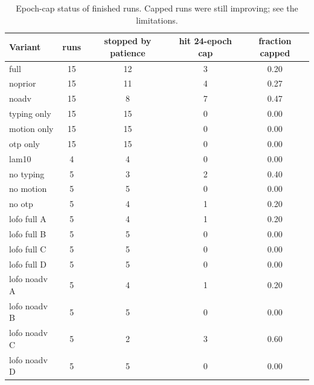 \begin{table}[t]
\caption{Epoch-cap status of finished runs. Capped runs were still improving; see the limitations.}
\label{tab:cap}
\centering
\small
\begin{tabular}{lcccc}
\toprule
Variant & runs & stopped by patience & hit 24-epoch cap & fraction capped \\
\midrule
full & 15 & 12 & 3 & 0.20 \\
noprior & 15 & 11 & 4 & 0.27 \\
noadv & 15 & 8 & 7 & 0.47 \\
typing only & 15 & 15 & 0 & 0.00 \\
motion only & 15 & 15 & 0 & 0.00 \\
otp only & 15 & 15 & 0 & 0.00 \\
lam10 & 4 & 4 & 0 & 0.00 \\
no typing & 5 & 3 & 2 & 0.40 \\
no motion & 5 & 5 & 0 & 0.00 \\
no otp & 5 & 4 & 1 & 0.20 \\
lofo full A & 5 & 4 & 1 & 0.20 \\
lofo full B & 5 & 5 & 0 & 0.00 \\
lofo full C & 5 & 5 & 0 & 0.00 \\
lofo full D & 5 & 5 & 0 & 0.00 \\
lofo noadv A & 5 & 4 & 1 & 0.20 \\
lofo noadv B & 5 & 5 & 0 & 0.00 \\
lofo noadv C & 5 & 2 & 3 & 0.60 \\
lofo noadv D & 5 & 5 & 0 & 0.00 \\
\bottomrule
\end{tabular}
\end{table}
